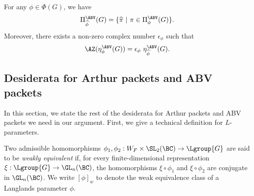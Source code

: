 \documentclass[11pt,letterpaper]{amsart}
\numberwithin{equation}{section}
\begin{document}
\begin{conjecture}
\label{conj AZ}
    For any 
    $\phi \in \Phi(G)$, 
    we have 
    \[\Pi_{\widehat{\phi}}^{\ABV}(G)=\{\widehat{\pi}\ | \ \pi \in \Pi_{\phi}^{\ABV}(G)\}.\]
     Moreover, there exists a non-zero complex number $\epsilon_{\phi}$ such that 
     \[
\AZ(\eta_{\phi}^{\ABV}(G))= \epsilon_{\phi}\ \eta_{\widehat{\phi}}^{\ABV}(G).
     \]
\end{conjecture}

\subsection{Desiderata for Arthur packets and ABV packets}
In this section, we state the rest of the desiderata for Arthur packets and ABV packets we need in our argument.
First, we give a technical definition for $L$-parameters. 

\begin{definition}\label{def weak equiv}
    Two admissible homomorphisms $\phi_1, \phi_2: W_F \times \SL_2(\BC) \to \Lgroup{G}$ are said to be {\it weakly equivalent} if, for every finite-dimensional representation $\xi: \Lgroup{G} \to \GL_n(\BC)$, the homomorphisms $\xi \circ \phi_1$ and $\xi \circ \phi_2$ are conjugate in $\GL_n(\BC)$. We write $[\phi]_w$
    to denote the weak equivalence class of a Langlands parameter $\phi$.
\end{definition}
\end{document}
